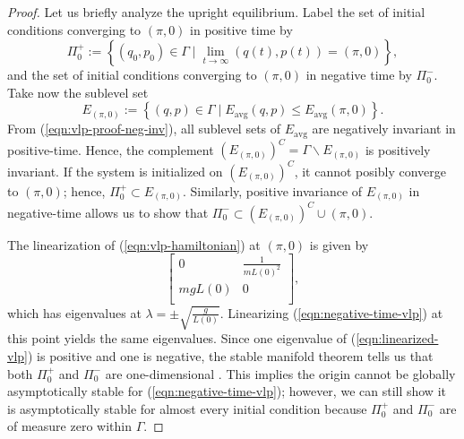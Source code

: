 \begin{proof}
   Let us briefly analyze the upright equilibrium.
   Label the set of initial conditions converging to \((\pi, 0)\) in
   positive time by
   \[
      \Pi_0^+ := \left\{ (q_0,p_0) \in \Gamma \mid \lim_{t \to \infty} (q(t),p(t)) = (\pi, 0) \right\}
      ,
   \]
   and the set of initial conditions converging to \((\pi,0)\)
   in negative time by \(\Pi_0^-\).
   Take now the sublevel set
   \[
      E_{(\pi,0)} := \left\{ (q,p) \in \Gamma \mid E_\text{avg}(q,p) \leq
         E_\text{avg}(\pi,0) \right\}
      .
   \] 
   From (\ref{eqn:vlp-proof-neg-inv}), all sublevel sets of \(E_\text{avg}\) are
   negatively invariant in positive-time. 
   Hence, the complement \(\left(E_{(\pi,0)}\right)^C = \Gamma \backslash E_{(\pi,0)}\) is
   positively invariant.
   If the system is initialized on \(\left(E_{(\pi,0)}\right)^C\), it cannot
   posibly converge to \((\pi,0)\);
   hence, \(\Pi_0^+ \subset E_{(\pi,0)}\).
   Similarly, positive invariance of \(E_{(\pi,0)}\) in negative-time allows us
   to show that \(\Pi_0^- \subset \left(E_{(\pi,0)}\right)^C \cup (\pi,0)\).

   The linearization of (\ref{eqn:vlp-hamiltonian}) at \((\pi, 0)\) is given by
   \begin{equation}\label{eqn:linearized-vlp}
      \begin{bmatrix}
         0 & \frac{1}{mL(0)^2} \\
         m g L(0) & 0 \\
      \end{bmatrix}
      ,
   \end{equation}
   which has eigenvalues at \(\lambda = \pm \sqrt{\frac{g}{L(0)}}\).
   Linearizing (\ref{eqn:negative-time-vlp}) at this point yields the same eigenvalues.
   Since one eigenvalue of (\ref{eqn:linearized-vlp})
   is positive and one is negative, the stable manifold theorem tells
   us that both \(\Pi_0^+\) and \(\Pi_0^-\) are one-dimensional
   \cite{stable_manifold}.
   This implies the origin cannot be globally asymptotically stable for
   (\ref{eqn:negative-time-vlp}); however, we can still show it is asymptotically stable
   for almost every initial condition because \(\Pi_0^+\) and \(\Pi_0^-\) are of
   measure zero within \(\Gamma\).


\end{proof}
